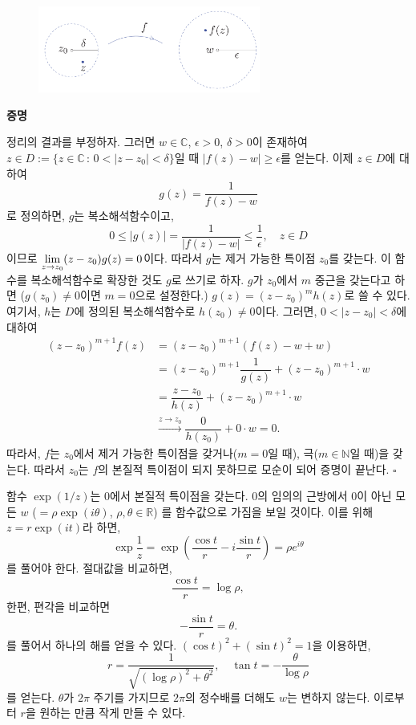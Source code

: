 \begin{figure}[h!]
\begin{center}
\includegraphics[width=0.65\textwidth]{./SaltChapter/figs/fig-4-0-9}
\end{center}
\end{figure}

{\bf 증명}

정리의 결과를 부정하자.
그러면 $w\in\mathbb C$, $\epsilon>0$, $\delta>0$이 존재하여
$z\in D:= \{ z\in\mathbb C\,:\, 0<|z-z_0|<\delta\}$일 때
$|f(z) -w| \ge \epsilon$를 얻는다.
이제  $z\in D$에 대하여
\[
g(z) = \dfrac1{f(z)-w}
\]
로 정의하면, $g$는 복소해석함수이고,
\[
0\le |g(z)| = \dfrac1{|f(z)-w|} \le \dfrac1\epsilon, \quad
z\in D
\]
이므로 
$\lim\limits_{z\to z_0} (z-z_0)g(z) = 0$이다.
따라서 $g$는 제거 가능한 특이점 $z_0$를 갖는다.
이 함수를 복소해석함수로 확장한 것도 $g$로 쓰기로 하자.
$g$가 $z_0$에서 $m$ 중근을 갖는다고 하면
($g(z_0)\ne0$이면 $m=0$으로 설정한다.)
$g(z) = (z-z_0)^m h(z)$로 쓸 수 있다.
여기서, $h$는 $D$에 정의된 복소해석함수로 $h(z_0)\ne0$이다.
그러면, $0 < |z-z_0| < \delta$에 대하여
\begin{align*}
(z-z_0)^{m+1} f(z)
&= (z-z_0)^{m+1}(f(z) -w + w) \\
&= (z-z_0)^{m+1} \dfrac1{g(z)} + (z-z_0)^{m+1}\cdot w \\
&= \dfrac{z-z_0}{h(z)} + (z-z_0)^{m+1}\cdot w \\
& \xrightarrow{z\to z_0}
\dfrac0{h(z_0)} + 0 \cdot w = 0.
\end{align*}
따라서, $f$는 $z_0$에서 제거 가능한 특이점을 갖거나($m=0$일 때),
극($m\in\mathbb N$일 때)을 갖는다.
따라서 $z_0$는 $f$의 본질적 특이점이 되지 못하므로
모순이 되어 증명이 끝난다. \hfill $\square$

\begin{saltexample}[label=example-4-17]{}{}
함수 $\exp (1/z)$는 $0$에서 본질적 특이점을 갖는다.
$0$의 임의의 근방에서
$0$이 아닌 모든  $w$ ($=\rho \exp(i\theta)$, $\rho, \theta \in \mathbb R$)
를 함수값으로 가짐을 보일 것이다.
이를 위해 $z= r\exp(it)$라 하면,
\[
\exp \dfrac 1z = \exp \left( \dfrac {\cos t}r  - i \dfrac{\sin t}r\right) 
= \rho e^{i\theta}
\]
를 풀어야 한다.
절대값을 비교하면,
\[
\dfrac{\cos t}r = \log \rho,
\]
한편, 편각을 비교하면
\[
- \dfrac{\sin t}r = \theta.
\]
를 풀어서 하나의 해를 얻을 수 있다.
$(\cos t)^2 + (\sin t)^2 =1$을 이용하면,
\[
r = \dfrac1{\sqrt{(\log \rho)^2 + \theta^2}},
\quad
\tan t = - \dfrac{\theta}{\log \rho}
\]
를 얻는다. $\theta$가 $2\pi$ 주기를 가지므로
$2\pi$의 정수배를 더해도 $w$는 변하지 않는다. 
이로부터 $r$을 원하는 만큼 작게 만들 수 있다.
\end{saltexample}


